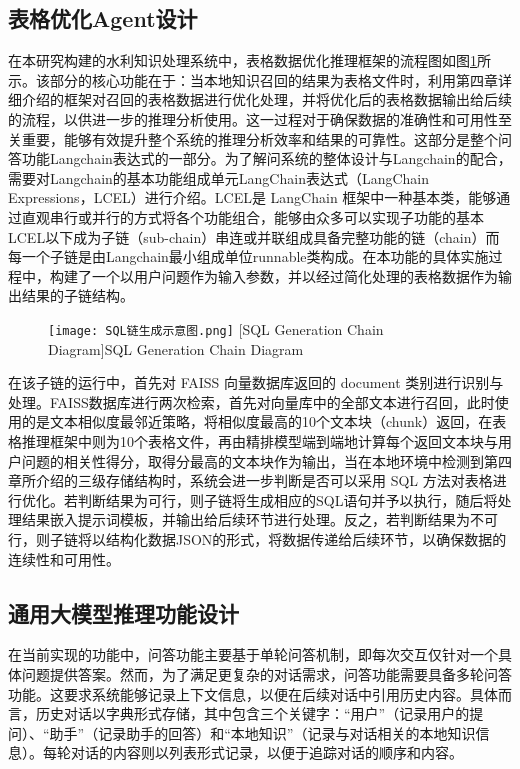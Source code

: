 \subsection{表格优化Agent设计}
在本研究构建的水利知识处理系统中，表格数据优化推理框架的流程图如图\ref{fig:SQL生成链}所示。该部分的核心功能在于：当本地知识召回的结果为表格文件时，利用第四章详细介绍的框架对召回的表格数据进行优化处理，并将优化后的表格数据输出给后续的流程，以供进一步的推理分析使用。这一过程对于确保数据的准确性和可用性至关重要，能够有效提升整个系统的推理分析效率和结果的可靠性。这部分是整个问答功能Langchain表达式的一部分。为了解问系统的整体设计与Langchain的配合，需要对Langchain的基本功能组成单元LangChain表达式（LangChain Expressions，LCEL）进行介绍。LCEL是 LangChain 框架中一种基本类，能够通过直观串行或并行的方式将各个功能组合，能够由众多可以实现子功能的基本LCEL以下成为子链（sub-chain）串连或并联组成具备完整功能的链（chain）而每一个子链是由Langchain最小组成单位runnable类构成。在本功能的具体实施过程中，构建了一个以用户问题作为输入参数，并以经过简化处理的表格数据作为输出结果的子链结构。
\begin{figure}[!htb]
    \centering
    \texttt{[image: SQL链生成示意图.png]}
    [SQL Generation Chain Diagram]{SQL Generation Chain Diagram}
    \label{fig:SQL生成链}
\end{figure}

在该子链的运行中，首先对 FAISS 向量数据库返回的 document 类别进行识别与处理。FAISS数据库进行两次检索，首先对向量库中的全部文本进行召回，此时使用的是文本相似度最邻近策略，将相似度最高的10个文本块（chunk）返回，在表格推理框架中则为10个表格文件，再由精排模型端到端地计算每个返回文本块与用户问题的相关性得分，取得分最高的文本块作为输出，当在本地环境中检测到第四章所介绍的三级存储结构时，系统会进一步判断是否可以采用 SQL 方法对表格进行优化。若判断结果为可行，则子链将生成相应的SQL语句并予以执行，随后将处理结果嵌入提示词模板，并输出给后续环节进行处理。反之，若判断结果为不可行，则子链将以结构化数据JSON的形式，将数据传递给后续环节，以确保数据的连续性和可用性。
\subsection{通用大模型推理功能设计}
在当前实现的功能中，问答功能主要基于单轮问答机制，即每次交互仅针对一个具体问题提供答案。然而，为了满足更复杂的对话需求，问答功能需要具备多轮问答功能。这要求系统能够记录上下文信息，以便在后续对话中引用历史内容。具体而言，历史对话以字典形式存储，其中包含三个关键字：“用户”（记录用户的提问）、“助手”（记录助手的回答）和“本地知识”（记录与对话相关的本地知识信息）。每轮对话的内容则以列表形式记录，以便于追踪对话的顺序和内容。

